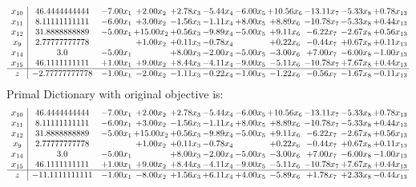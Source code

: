 \documentclass[9pt]{article}
\begin{document}
\[\begin{array}{c| c c@{\hskip 2pt} c@{\hskip 2pt} c@{\hskip 2pt} c@{\hskip 2pt} c@{\hskip 2pt} c@{\hskip 2pt} c@{\hskip 2pt} c@{\hskip 2pt} c@{\hskip 2pt} }
 x_{10}   &  46.4444444444 & -7.00 x_{1} & +  2.00 x_{2} & +  2.78 x_{3} & -5.44 x_{4} & -6.00 x_{5} & + 10.56 x_{6} & -13.11 x_{7} & -5.33 x_{8} & +  0.78 x_{13}\\
 x_{11}   &  8.11111111111 & -6.00 x_{1} & +  3.00 x_{2} & -1.56 x_{3} & -1.11 x_{4} & +  8.00 x_{5} & +  8.89 x_{6} & -10.78 x_{7} & -5.33 x_{8} & +  0.44 x_{13}\\
 x_{12}   &  31.8888888889 & -5.00 x_{1} & + 15.00 x_{2} & +  0.56 x_{3} & -9.89 x_{4} & -5.00 x_{5} & +  9.11 x_{6} & -6.22 x_{7} & -2.67 x_{8} & +  0.56 x_{13}\\
 x_{9}   &  2.77777777778  &   & +  1.00 x_{2} & +  0.11 x_{3} & -0.78 x_{4} &   & +  0.22 x_{6} & -0.44 x_{7} & +  0.67 x_{8} & +  0.11 x_{13}\\
 x_{14}   &  3.0 & -5.00 x_{1} &   & +  8.00 x_{3} & -2.00 x_{4} & -5.00 x_{5} & -3.00 x_{6} & +  7.00 x_{7} & -6.00 x_{8} & -1.00 x_{13}\\
 x_{15}   &  46.1111111111 & +  1.00 x_{1} & +  9.00 x_{2} & +  8.44 x_{3} & -4.11 x_{4} & -9.00 x_{5} & -5.11 x_{6} & -10.78 x_{7} & +  7.67 x_{8} & +  0.44 x_{13}\\
\hline
z    &  -2.77777777778 & -1.00 x_{1} & -2.00 x_{2} & -1.11 x_{3} & -0.22 x_{4} & -1.00 x_{5} & -1.22 x_{6} & -0.56 x_{7} & -1.67 x_{8} & -0.11 x_{13}\\
\end{array}\]
Primal Dictionary with original objective is:
\[\begin{array}{c| c c@{\hskip 2pt} c@{\hskip 2pt} c@{\hskip 2pt} c@{\hskip 2pt} c@{\hskip 2pt} c@{\hskip 2pt} c@{\hskip 2pt} c@{\hskip 2pt} c@{\hskip 2pt} }
 x_{10}   &  46.4444444444 & -7.00 x_{1} & +  2.00 x_{2} & +  2.78 x_{3} & -5.44 x_{4} & -6.00 x_{5} & + 10.56 x_{6} & -13.11 x_{7} & -5.33 x_{8} & +  0.78 x_{13}\\
 x_{11}   &  8.11111111111 & -6.00 x_{1} & +  3.00 x_{2} & -1.56 x_{3} & -1.11 x_{4} & +  8.00 x_{5} & +  8.89 x_{6} & -10.78 x_{7} & -5.33 x_{8} & +  0.44 x_{13}\\
 x_{12}   &  31.8888888889 & -5.00 x_{1} & + 15.00 x_{2} & +  0.56 x_{3} & -9.89 x_{4} & -5.00 x_{5} & +  9.11 x_{6} & -6.22 x_{7} & -2.67 x_{8} & +  0.56 x_{13}\\
 x_{9}   &  2.77777777778  &   & +  1.00 x_{2} & +  0.11 x_{3} & -0.78 x_{4} &   & +  0.22 x_{6} & -0.44 x_{7} & +  0.67 x_{8} & +  0.11 x_{13}\\
 x_{14}   &  3.0 & -5.00 x_{1} &   & +  8.00 x_{3} & -2.00 x_{4} & -5.00 x_{5} & -3.00 x_{6} & +  7.00 x_{7} & -6.00 x_{8} & -1.00 x_{13}\\
 x_{15}   &  46.1111111111 & +  1.00 x_{1} & +  9.00 x_{2} & +  8.44 x_{3} & -4.11 x_{4} & -9.00 x_{5} & -5.11 x_{6} & -10.78 x_{7} & +  7.67 x_{8} & +  0.44 x_{13}\\
\hline
z    &  -11.1111111111 & -1.00 x_{1} & -8.00 x_{2} & +  1.56 x_{3} & +  6.11 x_{4} & +  4.00 x_{5} & -5.89 x_{6} & +  1.78 x_{7} & +  2.33 x_{8} & -0.44 x_{13}\\
\end{array}\]
\end{document}
